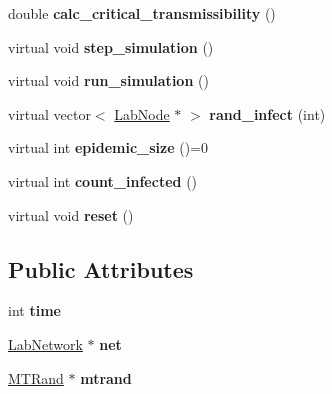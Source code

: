 \begin{DoxyCompactItemize}
\item 
\hypertarget{classstudy_1_1_simulator_aa9003f9c69703a19610a69570da5fd44}{double {\bfseries calc\+\_\+critical\+\_\+transmissibility} ()}\label{classstudy_1_1_simulator_aa9003f9c69703a19610a69570da5fd44}

\item 
\hypertarget{classstudy_1_1_simulator_a49bb707c64f0322f9ed1af2626dce678}{virtual void {\bfseries step\+\_\+simulation} ()}\label{classstudy_1_1_simulator_a49bb707c64f0322f9ed1af2626dce678}

\item 
\hypertarget{classstudy_1_1_simulator_a468e0fbd7d113b197b44b6955844c1af}{virtual void {\bfseries run\+\_\+simulation} ()}\label{classstudy_1_1_simulator_a468e0fbd7d113b197b44b6955844c1af}

\item 
\hypertarget{classstudy_1_1_simulator_a3de7d232e15d4a97bff2f740aabe6ceb}{virtual vector$<$ \hyperlink{classelps_1_1_lab_node}{Lab\+Node} $\ast$ $>$ {\bfseries rand\+\_\+infect} (int)}\label{classstudy_1_1_simulator_a3de7d232e15d4a97bff2f740aabe6ceb}

\item 
\hypertarget{classstudy_1_1_simulator_a250e931f29f5a072d7d9f5f9f069b001}{virtual int {\bfseries epidemic\+\_\+size} ()=0}\label{classstudy_1_1_simulator_a250e931f29f5a072d7d9f5f9f069b001}

\item 
\hypertarget{classstudy_1_1_simulator_aef7a1e2ef7975197fde3cb204b87662b}{virtual int {\bfseries count\+\_\+infected} ()}\label{classstudy_1_1_simulator_aef7a1e2ef7975197fde3cb204b87662b}

\item 
\hypertarget{classstudy_1_1_simulator_aca4ed92d7c3623f1e19862fcacc17062}{virtual void {\bfseries reset} ()}\label{classstudy_1_1_simulator_aca4ed92d7c3623f1e19862fcacc17062}

\end{DoxyCompactItemize}
\subsection*{Public Attributes}
\begin{DoxyCompactItemize}
\item 
\hypertarget{classstudy_1_1_simulator_a37a77a9be7334bd4e170856f88718387}{int {\bfseries time}}\label{classstudy_1_1_simulator_a37a77a9be7334bd4e170856f88718387}

\item 
\hypertarget{classstudy_1_1_simulator_affdae7b53a4db20f1376ac0d77a22e5a}{\hyperlink{classelps_1_1_lab_network}{Lab\+Network} $\ast$ {\bfseries net}}\label{classstudy_1_1_simulator_affdae7b53a4db20f1376ac0d77a22e5a}

\item 
\hypertarget{classstudy_1_1_simulator_a284ed814b506de6da20cc68d6a5cec3a}{\hyperlink{classelpm_1_1_m_t_rand}{M\+T\+Rand} $\ast$ {\bfseries mtrand}}\label{classstudy_1_1_simulator_a284ed814b506de6da20cc68d6a5cec3a}

\end{DoxyCompactItemize}
